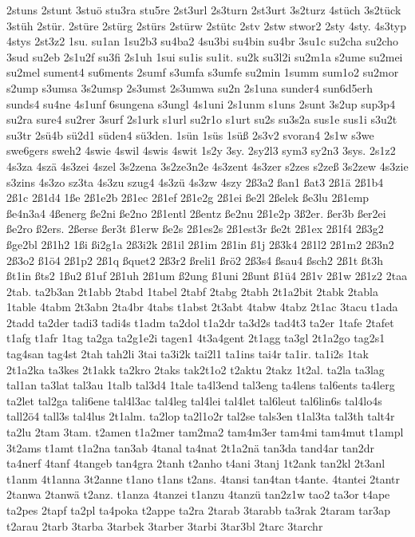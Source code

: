 {2stuns
2stunt
3stuö
stu3ra
stu5re
2st3url
2s3turn
2st3urt
3s2turz
4stüch
3s2tück
3stüh
2stür.
2stüre
2stürg
2stürs
2stürw
2stütc
2stv
2stw
stwor2
2sty
4sty.
4s3typ
4stys
2st3z2
1su.
su1an
1su2b3
su4ba2
4su3bi
su4bin
su4br
3su1c
su2cha
su2cho
3sud
su2eb
2s1u2f
su3fi
2s1uh
1sui
su1is
su1it.
su2k
su3l2i
su2m1a
s2ume
su2mei
su2mel
sument4
su6ments
2sumf
s3umfa
s3umfe
su2min
1summ
sum1o2
su2mor
s2ump
s3umsa
3s2umsp
2s3umst
2s3umwa
su2n
2s1una
sunder4
sun6d5erh
sunds4
su4ne
4s1unf
6sungena
s3ungl
4s1uni
2s1unm
s1uns
2sunt
3s2up
sup3p4
su2ra
sure4
su2rer
3surf
2s1urk
s1url
su2r1o
s1urt
su2s
su3s2a
sus1e
sus1i
s3u2t
su3tr
2sü4b
sü2d1
süden4
sü3den.
1sün
1süs
1süß
2s3v2
svoran4
2s1w
s3we
swe6gers
sweh2
4swie
4swil
4swis
4swit
1s2y
3sy.
2sy2l3
sym3
sy2n3
3sys.
2s1z2
4s3za
4szä
4s3zei
4szel
3s2zena
3s2ze3n2e
4s3zent
4s3zer
s2zes
s2zeß
3s2zew
4s3zie
s3zins
4s3zo
sz3ta
4s3zu
szug4
4s3zü
4s3zw
4szy
2ß3a2
ßan1
ßat3
2ß1ä
2ß1b4
2ß1c
2ß1d4
1ße
2ß1e2b
2ß1ec
2ß1ef
2ß1e2g
2ß1ei
ße2l
2ßelek
ße3lu
2ß1emp
ße4n3a4
4ßenerg
ße2ni
ße2no
2ß1entl
2ßentz
ße2nu
2ß1e2p
3ß2er.
ßer3b
ßer2ei
ße2ro
ß2ers.
2ßerse
ßer3t
ß1erw
ße2s
2ß1es2s
2ß1est3r
ße2t
2ß1ex
2ß1f4
2ß3g2
ßge2bl
2ß1h2
1ßi
ßi2g1a
2ß3i2k
2ß1il
2ß1im
2ß1in
ß1j
2ß3k4
2ß1l2
2ß1m2
2ß3n2
2ß3o2
ß1ö4
2ß1p2
2ß1q
ßquet2
2ß3r2
ßreli1
ßrö2
2ß3s4
ßsau4
ßsch2
2ß1t
ßt3h
ßt1in
ßts2
1ßu2
ß1uf
2ß1uh
2ß1um
ß2ung
ß1uni
2ßunt
ß1ü4
2ß1v
2ß1w
2ß1z2
2taa
2tab.
ta2b3an
2t1abb
2tabd
1tabel
2tabf
2tabg
2tabh
2t1a2bit
2tabk
2tabla
1table
4tabm
2t3abn
2ta4br
4tabs
t1abst
2t3abt
4tabw
4tabz
2t1ac
3tacu
t1ada
2tadd
ta2der
tadi3
tadi4s
t1adm
ta2dol
t1a2dr
ta3d2s
tad4t3
ta2er
1tafe
2tafet
t1afg
t1afr
1tag
ta2ga
ta2g1e2i
tagen1
4t3a4gent
2t1agg
ta3gl
2t1a2go
tag2s1
tag4san
tag4st
2tah
tah2li
3tai
ta3i2k
tai2l1
ta1ins
tai4r
ta1ir.
ta1i2s
1tak
2t1a2ka
ta3kes
2t1akk
ta2kro
2taks
tak2t1o2
t2aktu
2takz
1t2al.
ta2la
ta3lag
tal1an
ta3lat
tal3au
1talb
tal3d4
1tale
ta4l3end
tal3eng
ta4lens
tal6ents
ta4lerg
ta2let
tal2ga
tali6ene
tal4l3ac
tal4leg
tal4lei
tal4let
tal6leut
tal6lin6s
tal4lo4s
tall2ö4
tall3s
tal4lus
2t1alm.
ta2lop
ta2l1o2r
tal2se
tals3en
t1al3ta
tal3th
talt4r
ta2lu
2tam
3tam.
t2amen
t1a2mer
tam2ma2
tam4m3er
tam4mi
tam4mut
t1ampl
3t2ams
t1amt
t1a2na
tan3ab
4tanal
ta4nat
2t1a2nä
tan3da
tand4ar
tan2dr
ta4nerf
4tanf
4tangeb
tan4gra
2tanh
t2anho
t4ani
3tanj
1t2ank
tan2kl
2t3anl
t1anm
4t1anna
3t2anne
t1ano
t1ans
t2ans.
4tansi
tan4tan
t4ante.
4tantei
2tantr
2tanwa
2tanwä
t2anz.
t1anza
4tanzei
t1anzu
4tanzü
tan2z1w
tao2
ta3or
t4ape
ta2pes
2tapf
ta2pl
ta4poka
t2appe
ta2ra
2tarab
3tarabb
ta3rak
2taram
tar3ap
t2arau
2tarb
3tarba
3tarbek
3tarber
3tarbi
3tar3bl
2tarc
3tarchr
}
